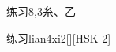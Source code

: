 \begin{entry}{练习}{8,3}{⽷、⼄}
  \begin{phonetics}{练习}{lian4xi2}[][HSK 2]
  \end{phonetics}
\end{entry}
